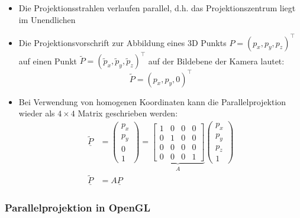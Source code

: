 \documentclass{scrartcl}
\begin{document}
\begin{itemize}
	\item Die Projektionsstrahlen verlaufen parallel, d.h. das Projektionszentrum liegt im Unendlichen
	\item Die Projektionsvorschrift zur Abbildung eines 3D Punkts $P = (p_x, p_y, p_z)^\top$ auf einen Punkt $\widetilde{P} = (\widetilde{p}_x, \widetilde{p}_y, \widetilde{p}_z)^\top$ auf der Bildebene der Kamera lautet: \\
	\begin{equation}
		\widetilde{P} = (p_x, p_y, 0)^\top
	\end{equation}
	\item Bei Verwendung von homogenen Koordinaten kann die Parallelprojektion wieder als $4 \times 4$ Matrix geschrieben werden: \\
	\begin{equation}
		\begin{split}
			\underline{\widetilde{P}} &= \begin{pmatrix}
			p_x \\
			p_y \\
			0 \\
			1
			\end{pmatrix} = \underbrace{\begin{bmatrix}
			1 & 0 & 0 & 0 \\
			0 & 1 & 0 & 0 \\
			0 & 0 & 0 & 0 \\
			0 & 0 & 0 & 1
			\end{bmatrix}}_A \begin{pmatrix}
			p_x \\
			p_y \\
			p_z \\
			1
			\end{pmatrix} \\
			\underline{\widetilde{P}} &= A \underline{P}
		\end{split}
	\end{equation}
\end{itemize}

\subsubsection{Parallelprojektion in OpenGL}
\end{document}
